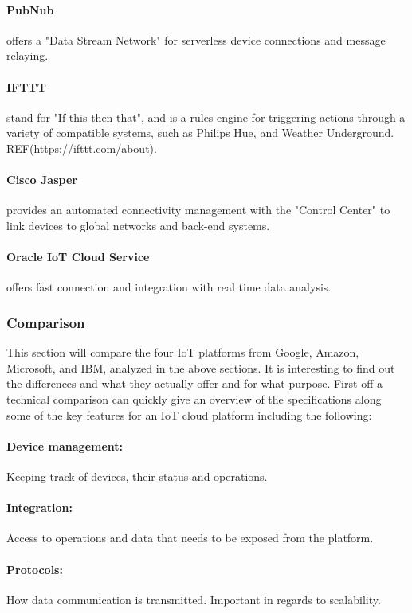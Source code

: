 \paragraph{PubNub} offers a "Data Stream Network" for serverless device connections and message relaying.
\paragraph{IFTTT} stand for "If this then that", and is a rules engine for triggering actions through a variety of compatible systems, such as Philips Hue, and Weather Underground. REF(https://ifttt.com/about).
\paragraph{Cisco Jasper} provides an automated connectivity management with the "Control Center" to link devices to global networks and back-end systems. 
\paragraph{Oracle IoT Cloud Service} offers fast connection and integration with real time data analysis.


\subsubsection{Comparison}
This section will compare the four IoT platforms from Google, Amazon, Microsoft, and IBM, analyzed in the above sections. It is interesting to find out the differences and what they actually offer and for what purpose. First off a technical comparison can quickly give an overview of the specifications along some of the key features for an IoT cloud platform including the following:
\paragraph{Device management:} Keeping track of devices, their status and operations.
\paragraph{Integration:} Access to operations and data that needs to be exposed from the platform.
\paragraph{Protocols:} How data communication is transmitted. Important in regards to scalability.
